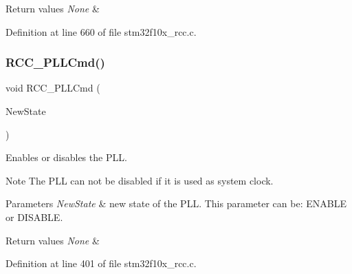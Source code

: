 \begin{DoxyRetVals}{Return values}
{\em None} & \\
\hline
\end{DoxyRetVals}


Definition at line 660 of file stm32f10x\+\_\+rcc.\+c.

\mbox{\label{group___r_c_c___exported___functions_ga84dee53c75e58fdb53571716593c2272}} 
\subsubsection{\texorpdfstring{R\+C\+C\+\_\+\+P\+L\+L\+Cmd()}{RCC\_PLLCmd()}}
{\footnotesize\ttfamily void R\+C\+C\+\_\+\+P\+L\+L\+Cmd (\begin{DoxyParamCaption}\item[{\hyperlink{group___exported__types_gac9a7e9a35d2513ec15c3b537aaa4fba1}{Functional\+State}}]{New\+State }\end{DoxyParamCaption})}



Enables or disables the P\+LL. 

\begin{DoxyNote}{Note}
The P\+LL can not be disabled if it is used as system clock. 
\end{DoxyNote}

\begin{DoxyParams}{Parameters}
{\em New\+State} & new state of the P\+LL. This parameter can be\+: E\+N\+A\+B\+LE or D\+I\+S\+A\+B\+LE. \\
\hline
\end{DoxyParams}

\begin{DoxyRetVals}{Return values}
{\em None} & \\
\hline
\end{DoxyRetVals}


Definition at line 401 of file stm32f10x\+\_\+rcc.\+c.

\mbox{\label{group___r_c_c___exported___functions_ga0f67634cbe721f2c42f022d2a93229c8}} 
